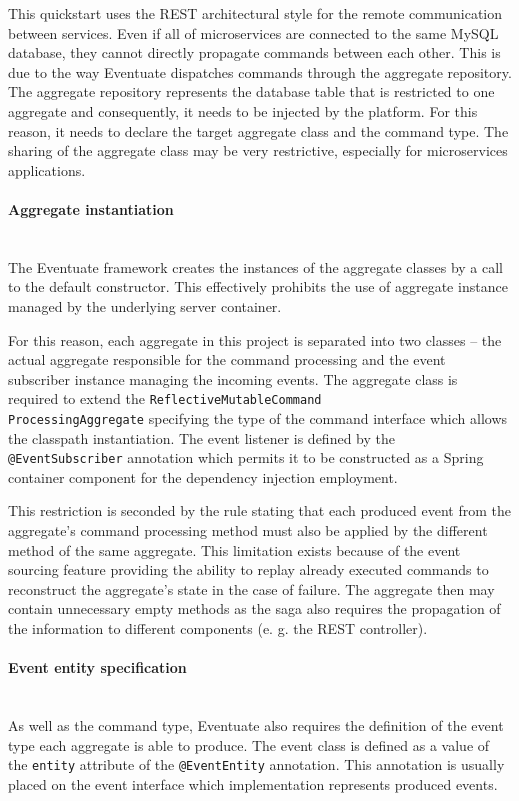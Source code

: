 \documentclass[oneside,
  digital, %
  table,   %
  nolof,     %
  nolot,     %
]{fithesis3}
\newcommand{\newlinepar}[1]{\paragraph{#1}\needspace{4\baselineskip}\mbox{}\\}
\begin{document}
This quickstart uses the REST architectural style for the remote communication between services. Even if all of microservices are connected to the same MySQL database, they cannot directly propagate commands between each other. This is due to the way Eventuate dispatches commands through the aggregate repository. The aggregate repository represents the database table that is restricted to one aggregate and consequently, it needs to be injected by the platform. For this reason, it needs to declare the target aggregate class and the command type. The sharing of the aggregate class may be very restrictive, especially for microservices applications.

\newlinepar{Aggregate instantiation}

The Eventuate framework creates the instances of the aggregate classes by a call to the default constructor. This effectively prohibits the use of aggregate instance managed by the underlying server container. 

For this reason, each aggregate in this project is separated into two classes -- the actual aggregate responsible for the command processing and the event subscriber instance managing the incoming events. The  aggregate class is required to extend the \texttt{ReflectiveMutableCommand\\ProcessingAggregate} specifying the type of the command interface which allows the classpath instantiation. The event listener is defined by the \texttt{@EventSubscriber} annotation which permits it to be constructed as a Spring container component for the dependency injection employment. 

This restriction is seconded by the rule stating that each produced event from the aggregate's command processing method must also be applied by the different method of the same aggregate. This limitation exists because of the event sourcing feature providing the ability to replay already executed commands to reconstruct the aggregate's state in the case of failure. The aggregate then may contain unnecessary empty methods as the saga also requires the propagation of the information to different components (e. g. the REST controller).


\newlinepar{Event entity specification}

As well as the command type, Eventuate also requires the definition of the event type each aggregate is able to produce. The event class is defined as a value of the \texttt{entity} attribute of the \texttt{@EventEntity} annotation. This annotation is usually placed on the event interface which implementation represents produced events.
\end{document}
